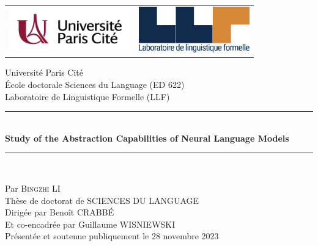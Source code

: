 \documentclass[12pt,oneside]{book} %
\newcommand{\HRule}{\rule{\linewidth}{0.7mm}}
\newcommand{\Hrule}{\rule{\linewidth}{0.3mm}}
\newcommand{\mycomment}[1]{}
\begin{document}
	\begin{titlepage}
		\begin{center}
			\begin{tabular}{c@{\hskip 3cm}c}
				\includegraphics[height=2cm]{images/uparis-logo-texte.png} &
				\includegraphics[height=2cm]{images/LLF_logo.png}\\
			\end{tabular}
		\end{center}
	
		
		\begin{center}

			{\Large Université Paris Cité}\\
             École doctorale Sciences du Language (ED 622)   \\
			Laboratoire de Linguistique Formelle (LLF)
  
  			\vfill
  			
	 		\HRule \\[0.1cm]
	 		 { \Large \bfseries Study of the Abstraction Capabilities of Neural Language Models%
            }
	  		\Hrule \\
		
		\end{center}
		
		\vfill
			
		\begin{center}
			Par \textsc{\Large Bingzhi LI}\\[1cm] 
			{\fontsize{14}{14}\selectfont Thèse de doctorat de SCIENCES DU LANGUAGE} 
            \\[1cm]
           {\large Dirigée par Benoît CRABBÉ \\
            Et co-encadrée par Guillaume WISNIEWSKI } \\ [1cm]
            {\fontsize{14}{14}\selectfont Présentée et soutenue publiquement le 28 novembre 2023}\\
			\vspace{1cm}
		\end{center}
  

\end{titlepage}
\end{document}

